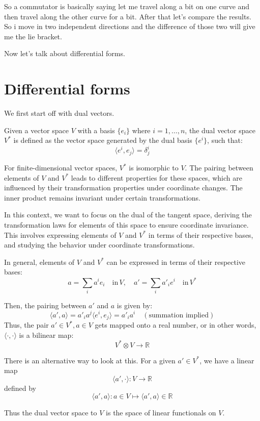 \documentclass{article}
\begin{document}
So a commutator is basically saying let me travel along a bit on one curve and then travel along the other curve for a bit. After that let's compare the results. So i move in two independent directions and the difference of those two will give me the lie bracket. 

Now let's talk about differential forms. 

\section{Differential forms}
We first start off with dual vectors. 

Given a vector space \( V \) with a basis \( \{e_i\} \) where \( i = 1, \ldots, n \), the dual vector space \( V^* \) is defined as the vector space generated by the dual basis \( \{e^i\} \), such that:
\[
\langle e^i, e_j \rangle = \delta^i_j
\]

For finite-dimensional vector spaces, \( V^* \) is isomorphic to \( V \). The pairing between elements of \( V \) and \( V^* \) leads to different properties for these spaces, which are influenced by their transformation properties under coordinate changes. The inner product remains invariant under certain transformations.

In this context, we want to focus on the dual of the tangent space, deriving the transformation laws for elements of this space to ensure coordinate invariance. This involves expressing elements of \( V \) and \( V^* \) in terms of their respective bases, and studying the behavior under coordinate transformations.

In general, elements of \( V \) and \( V^* \) can be expressed in terms of their respective bases:
\[
a = \sum_{i} a^i e_i \quad \text{in} \, V, \quad a' = \sum_{i} a'_i e^{i} \quad \text{in} \, V^*
\]

Then, the pairing between \( a' \) and \( a \) is given by:
\[
\langle a', a \rangle = a'_i a^j \langle e^i, e_j \rangle = a'_i a^i \quad (\text{summation implied})
\]
Thus, the pair \( a' \in V^*, a \in V \) gets mapped onto a real number, or in other words, \( \langle \cdot, \cdot \rangle \) is a bilinear map:
\[
V^* \otimes V \to \mathbb{R}
\]

There is an alternative way to look at this. For a given \( a' \in V^* \), we have a linear map
\[
\langle a', \cdot \rangle : V \to \mathbb{R}
\]
defined by
\[
\langle a', a \rangle : a \in V \mapsto \langle a', a \rangle \in \mathbb{R}
\]

Thus the dual vector space to \( V \) is the space of linear functionals on \( V \).
\end{document}
